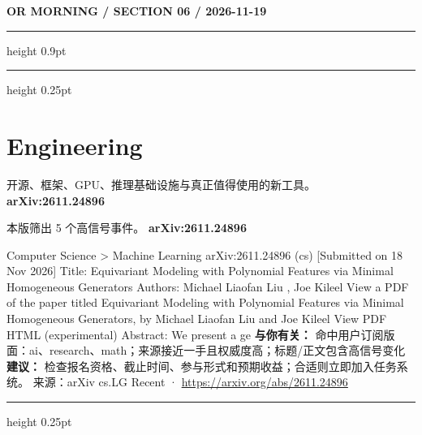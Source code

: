 \documentclass[10.5pt]{ctexart}
\begin{document}
\newpage
{\small\bfseries OR MORNING / SECTION 06 / 2026-11-19}
\vspace{2mm}
\hrule height 0.9pt
\vspace{1.5mm}
\hrule height 0.25pt
\vspace{4mm}
\section*{Engineering}
{\color{ormuted} 开源、框架、GPU、推理基础设施与真正值得使用的新工具。}
\vspace{2mm}
{\LARGE\bfseries arXiv:2611.24896}\par
\vspace{1mm}
{\color{ormuted} 本版筛出 5 个高信号事件。}
\vspace{3mm}
{\Large\bfseries arXiv:2611.24896}\par
Computer Science > Machine Learning arXiv:2611.24896 (cs) [Submitted on 18 Nov 2026] Title: Equivariant Modeling with Polynomial Features via Minimal Homogeneous Generators Authors: Michael Liaofan Liu , Joe Kileel View a PDF of the paper titled Equivariant Modeling with Polynomial Features via Minimal Homogeneous Generators, by Michael Liaofan Liu and Joe Kileel View PDF HTML (experimental) Abstract: We present a ge
\textbf{与你有关：} 命中用户订阅版面：ai、research、math；来源接近一手且权威度高；标题/正文包含高信号变化
\textbf{建议：} 检查报名资格、截止时间、参与形式和预期收益；合适则立即加入任务系统。
{\footnotesize\color{ormuted} 来源：arXiv cs.LG Recent · \url{https://arxiv.org/abs/2611.24896}}
\vspace{4mm}
\hrule height 0.25pt
\vspace{3mm}
\end{document}
